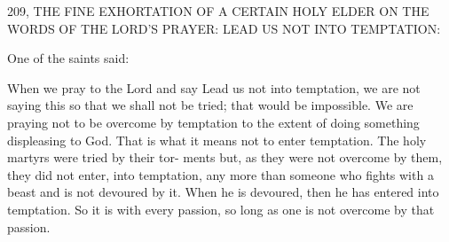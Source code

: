 209, THE FINE EXHORTATION OF A
CERTAIN HOLY ELDER ON THE WORDS OF THE
LORD'S PRAYER: LEAD US NOT INTO TEMPTATION:

One of the saints said:

When we pray to the Lord and say Lead us not into temptation, we
are not saying this so that we shall not be tried; that would be
impossible.
We are praying not to be overcome by temptation to the
extent of doing something displeasing to God.
That is what it means
not to enter temptation.
The holy martyrs were tried by their tor-
ments but, as they were not overcome by them, they did not enter,
into temptation, any more than someone who fights with a beast
and is not devoured by it.
When he is devoured, then he has entered
into temptation.
So it is with every passion, so long as one is not
overcome by that passion.

